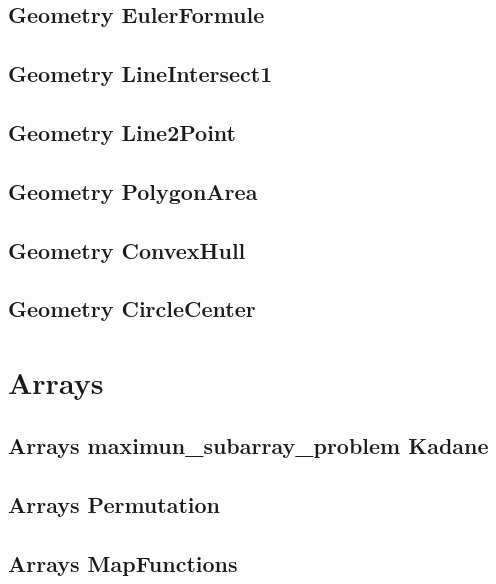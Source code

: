 \subsection{Geometry EulerFormule}
\raggedbottom
\hrulefill
\subsection{Geometry LineIntersect1}
\raggedbottom
\hrulefill
\subsection{Geometry Line2Point}
\raggedbottom
\hrulefill
\subsection{Geometry PolygonArea}
\raggedbottom
\hrulefill
\subsection{Geometry ConvexHull}
\raggedbottom
\hrulefill
\subsection{Geometry CircleCenter}
\raggedbottom
\hrulefill

\section{Arrays}
\subsection{Arrays maximun_subarray_problem Kadane}
\raggedbottom
\hrulefill
\subsection{Arrays Permutation}
\raggedbottom
\hrulefill
\subsection{Arrays MapFunctions}
\raggedbottom
\hrulefill
